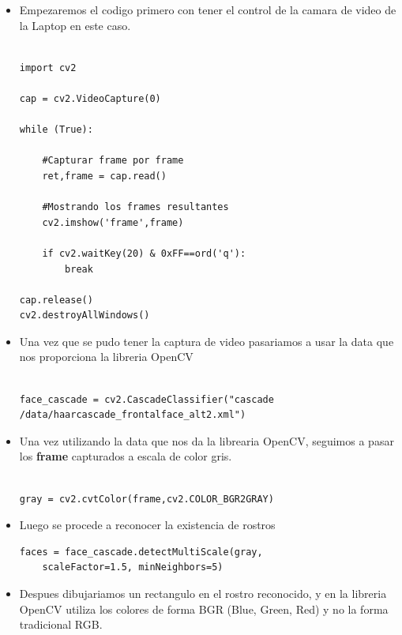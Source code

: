 \documentclass{vgtc}                          %
\begin{document}
\begin{itemize}

\item Empezaremos el codigo primero con tener el control de la camara de video de la Laptop en este caso.

\begin{lstlisting}

import cv2

cap = cv2.VideoCapture(0)

while (True):

    #Capturar frame por frame
    ret,frame = cap.read()
   
    #Mostrando los frames resultantes
    cv2.imshow('frame',frame)

    if cv2.waitKey(20) & 0xFF==ord('q'):
        break

cap.release()
cv2.destroyAllWindows()
\end{lstlisting}

\item Una vez que se pudo tener la captura de video pasariamos a usar la data que nos proporciona la libreria OpenCV

\begin{lstlisting}

face_cascade = cv2.CascadeClassifier("cascade
/data/haarcascade_frontalface_alt2.xml")

\end{lstlisting}

\item Una vez utilizando la data que nos da la librearia OpenCV, seguimos a pasar los \textbf{frame} capturados a escala de color gris.

\begin{lstlisting}

gray = cv2.cvtColor(frame,cv2.COLOR_BGR2GRAY)

\end{lstlisting}

\item Luego se procede a reconocer la existencia de rostros


\begin{lstlisting}
faces = face_cascade.detectMultiScale(gray,
	scaleFactor=1.5, minNeighbors=5)
\end{lstlisting}

\item Despues dibujariamos un rectangulo en el rostro reconocido, y en la libreria OpenCV utiliza los colores de forma BGR (Blue, Green, Red) y no la forma tradicional RGB.


\end{itemize}
\end{document}
